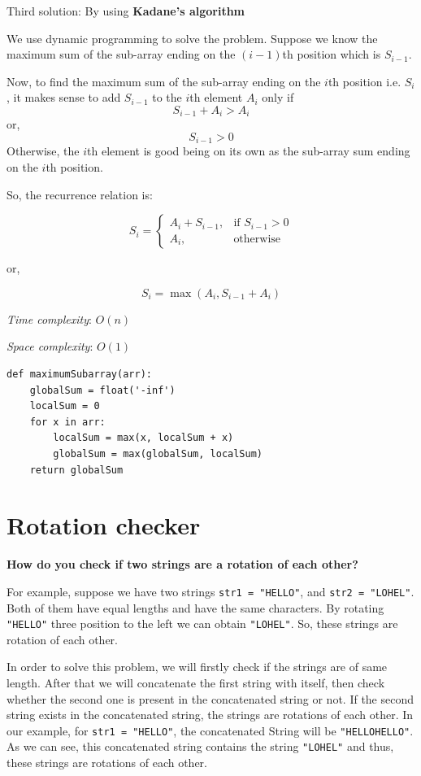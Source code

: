 \documentclass[a4paper,11pt]{book}
\begin{document}
\noindent Third solution: By using \textbf{Kadane's algorithm}

\noindent We use dynamic programming to solve the problem. Suppose we know the maximum sum of the sub-array ending on the $(i-1)$th position which is $S_{i-1}$.

\noindent Now, to find the maximum sum of the sub-array ending on the $i$th position i.e. $S_i$, it makes sense to add $S_{i-1}$ to the $i$th element $A_i$ only if 
$$S_{i-1} + A_i > A_i$$
or,
$$S_{i-1} > 0$$
\noindent Otherwise, the $i$th element is good being on its own as the sub-array sum ending on the $i$th position.

\noindent So, the recurrence relation is:

\[
    S_i = 
\begin{cases}
    A_i + S_{i-1} ,& \text{if } S_{i-1} > 0\\
    A_i,              & \text{otherwise}
\end{cases}
\]

or,

$$S_i = \max(A_i, S_{i-1} + A_i)$$

\noindent \textit{Time complexity}: $O(n)$

\noindent \textit{Space complexity}: $O(1)$

\begin{lstlisting}
def maximumSubarray(arr):
    globalSum = float('-inf')
    localSum = 0
    for x in arr:
        localSum = max(x, localSum + x)
        globalSum = max(globalSum, localSum)
    return globalSum
\end{lstlisting}

\newpage
\section{Rotation checker}
\textbf{How do you check if two strings are a rotation of each other?}
\vspace{5mm}

\noindent For example, suppose we have two strings \lstinline{str1 = "HELLO"}, and \lstinline{str2 = "LOHEL"}. Both of them have equal lengths and have the same characters. By rotating \lstinline{"HELLO"} three position to the left we can obtain \lstinline{"LOHEL"}. So, these strings are rotation of each other.

\noindent In order to solve this problem, we will firstly check if the strings are of same length. After that we will concatenate the first string with itself, then check whether the second one is present in the concatenated string or not. If the second string exists in the concatenated string, the strings are rotations of each other. In our example, for \lstinline{str1 = "HELLO"},  the concatenated String will be \lstinline{"HELLOHELLO"}. As we can see, this concatenated string contains the string \lstinline{"LOHEL"} and thus, these strings are rotations of each other.
\vspace{5mm}
\end{document}
